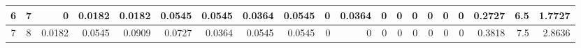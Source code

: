 \begin{table}[ht]
\begin{adjustbox}{width = \textwidth, center}
\begin{tabular}{|cc|r|r|r|r|r|r|r|r|r|r|r|r|r|r|r|rrr|}
        \cellcolor[HTML]{C9DAF8}6            & \cellcolor[HTML]{EBF1FC}7           & \cellcolor[HTML]{FFFFFF}0                      & \cellcolor[HTML]{DEF2E8}0.0182                 & \cellcolor[HTML]{DEF2E8}0.0182                 & \cellcolor[HTML]{9BD7B9}0.0545                 & \cellcolor[HTML]{9BD7B9}0.0545                 & \cellcolor[HTML]{BCE4D1}0.0364                 & \cellcolor[HTML]{9BD7B9}0.0545                 & \cellcolor[HTML]{FFFFFF}0                       & \cellcolor[HTML]{BCE4D1}0.0364                  & \cellcolor[HTML]{FFFFFF}0                       & \cellcolor[HTML]{FFFFFF}0                       & \cellcolor[HTML]{FFFFFF}0                       & \cellcolor[HTML]{FFFFFF}0                       & \cellcolor[HTML]{FFFFFF}0                       & \cellcolor[HTML]{FFFFFF}0                       & \multicolumn{1}{r|}{\cellcolor[HTML]{D9D2E9}0.2727}                                   & \multicolumn{1}{r|}{\cellcolor[HTML]{D9D2E9}6.5}                        & \cellcolor[HTML]{D9D2E9}1.7727                                                              \\ \hline
        \cellcolor[HTML]{C9DAF8}7            & \cellcolor[HTML]{EBF1FC}8           & \cellcolor[HTML]{DEF2E8}0.0182                 & \cellcolor[HTML]{9BD7B9}0.0545                 & \cellcolor[HTML]{57BB8A}0.0909                 & \cellcolor[HTML]{79C9A2}0.0727                 & \cellcolor[HTML]{BCE4D1}0.0364                 & \cellcolor[HTML]{9BD7B9}0.0545                 & \cellcolor[HTML]{9BD7B9}0.0545                 & \cellcolor[HTML]{FFFFFF}0                       & \cellcolor[HTML]{FFFFFF}0                       & \cellcolor[HTML]{FFFFFF}0                       & \cellcolor[HTML]{FFFFFF}0                       & \cellcolor[HTML]{FFFFFF}0                       & \cellcolor[HTML]{FFFFFF}0                       & \cellcolor[HTML]{FFFFFF}0                       & \cellcolor[HTML]{FFFFFF}0                       & \multicolumn{1}{r|}{\cellcolor[HTML]{D9D2E9}0.3818}                                   & \multicolumn{1}{r|}{\cellcolor[HTML]{D9D2E9}7.5}                        & \cellcolor[HTML]{D9D2E9}2.8636                                                              \\ \hline

\end{tabular}
\end{adjustbox}
\end{table}

